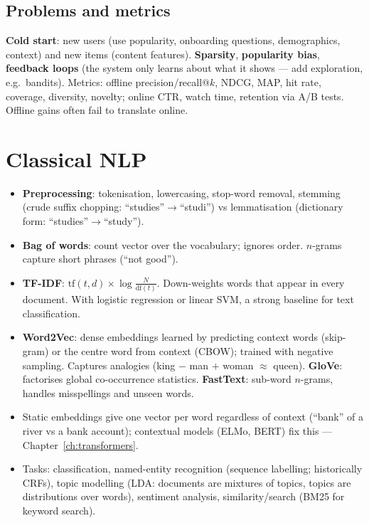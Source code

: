 \subsection{Problems and metrics}
\textbf{Cold start}: new users (use popularity, onboarding questions, demographics, context) and new items (content features). \textbf{Sparsity}, \textbf{popularity bias}, \textbf{feedback loops} (the system only learns about what it shows --- add exploration, e.g.\ bandits). Metrics: offline precision/recall@$k$, NDCG, MAP, hit rate, coverage, diversity, novelty; online CTR, watch time, retention via A/B tests. Offline gains often fail to translate online.

\section{Classical NLP}
\begin{itemize}
  \item \textbf{Preprocessing}: tokenisation, lowercasing, stop-word removal, stemming (crude suffix chopping: ``studies''$\to$``studi'') vs lemmatisation (dictionary form: ``studies''$\to$``study'').
  \item \textbf{Bag of words}: count vector over the vocabulary; ignores order. $n$-grams capture short phrases (``not good'').
  \item \textbf{TF-IDF}: $\text{tf}(t,d)\times\log\frac{N}{\text{df}(t)}$. Down-weights words that appear in every document. With logistic regression or linear SVM, a strong baseline for text classification.
  \item \textbf{Word2Vec}: dense embeddings learned by predicting context words (skip-gram) or the centre word from context (CBOW); trained with negative sampling. Captures analogies (king $-$ man $+$ woman $\approx$ queen). \textbf{GloVe}: factorises global co-occurrence statistics. \textbf{FastText}: sub-word $n$-grams, handles misspellings and unseen words.
  \item Static embeddings give one vector per word regardless of context (``bank'' of a river vs a bank account); contextual models (ELMo, BERT) fix this --- Chapter~\ref{ch:transformers}.
  \item Tasks: classification, named-entity recognition (sequence labelling; historically CRFs), topic modelling (LDA: documents are mixtures of topics, topics are distributions over words), sentiment analysis, similarity/search (BM25 for keyword search).
\end{itemize}

